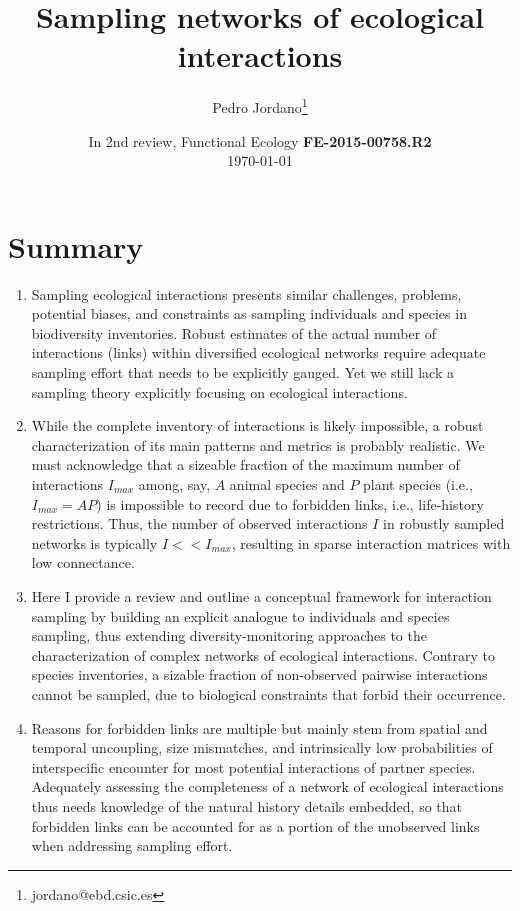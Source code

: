 \documentclass[12pt]{article}
\title{Sampling networks of ecological interactions}
\author[a]{Pedro Jordano\thanks{jordano@ebd.csic.es}}
\affil[a]{\small Integrative Ecology Group, Estaci\'on Biol\'ogica de Do\~nana, Consejo Superior de Investigaciones Cient\'ificas (EBD-CSIC), Avenida Americo Vespucio s\slash n, E--41092 Sevilla, Spain}
\date{\small In 2nd review, Functional Ecology \textbf{FE-2015-00758.R2}\\ \today}
\begin{document}
\maketitle
\section*{Summary}
\begin{enumerate}
\item Sampling ecological interactions presents similar challenges, problems, potential biases, and constraints as sampling individuals and species in biodiversity inventories. Robust estimates of the actual number of interactions (links) within diversified ecological networks require adequate sampling effort that needs to be explicitly gauged. Yet we still lack a sampling theory explicitly focusing on ecological interactions.

\item While the complete inventory of interactions is likely impossible, a robust characterization of its main patterns and metrics is probably realistic. We must acknowledge that a sizeable fraction of the maximum number of interactions $I_{max}$ among, say, $A$ animal species and $P$ plant species (i.e., $I_{max}= AP$) is impossible to record due to forbidden links, i.e., life-history restrictions. Thus, the number of observed interactions $I$ in robustly sampled networks is typically $I<<I_{max}$, resulting in sparse interaction matrices with low connectance.

\item Here I provide a review and outline a conceptual framework for interaction sampling by building an explicit analogue to individuals and species sampling, thus extending diversity-monitoring approaches to the characterization of complex networks of ecological interactions. Contrary to species inventories, a sizable fraction of non-observed pairwise interactions cannot be sampled, due to biological constraints that forbid their occurrence.  

\item Reasons for forbidden links are multiple but mainly stem from spatial and temporal uncoupling, size mismatches, and intrinsically low probabilities of interspecific encounter for most potential interactions of partner species. Adequately assessing the completeness of a network of ecological interactions thus needs knowledge of the natural history details embedded, so that forbidden links can be accounted for as a portion of the unobserved links when addressing sampling effort.


\end{enumerate}
\end{document}
